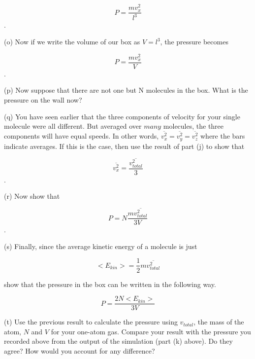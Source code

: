 \[
P=\frac{mv_{x}^{2}}{l^{3}}\].

\vspace{5mm}

(o) Now if we write the volume of our box as \( V=l^{3} \), the pressure becomes

\[
P=\frac{mv_{x}^{2}}{V}\].

(p) Now suppose that there are not one but N molecules in the box. What
is the pressure on the wall now?
\vspace{20mm}

(q) You have seen earlier that the three components of velocity for your single molecule were all different.  But averaged over $many$ molecules, the three components will have equal speeds.  In other words, \( \overline{v_{x}^{2}}=\overline{v_{y}^{2}}=\overline{v_{z}^{2}} \) where the bars indicate averages. If this is the case, then use the result of part (j) to show that

\[
\overline{v_{x}^{2}}=\frac{\overline{v_{total}^{2}}}{3}\].


(r) Now show that 

\[
P=N\frac{m\overline{v_{total}^{2}}}{3V}\].

\vspace{20mm}

(s) Finally, since the average kinetic energy of a molecule is just

\[
<E_{kin}>=\frac{1}{2}m\overline{v_{total}^{2}}\]


show that the pressure in the box can be written in the following
way.

\[
P=\frac{2N<E_{kin}>}{3V}\]
\vspace{20mm}

(t) Use the previous result to calculate the pressure using $v_{total}$, the mass of the atom, $N$ and $V$ for your one-atom gas. Compare your result with the pressure you recorded above from the output of the simulation (part (k) above).
Do they agree? How would you account for any difference?
\vspace{20mm}
